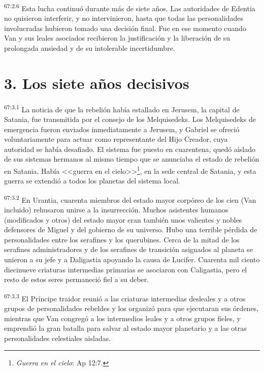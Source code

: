 \par
\textsuperscript{67:2.6} Esta lucha continuó durante más de siete años. Las autoridades de Edentia no quisieron interferir, y no intervinieron, hasta que todas las personalidades involucradas hubieron tomado una decisión final. Fue en ese momento cuando Van y sus leales asociados recibieron la justificación y la liberación de su prolongada ansiedad y de su intolerable incertidumbre.

\section*{3. Los siete años decisivos}
\par
\textsuperscript{67:3.1} La noticia de que la rebelión había estallado en Jerusem, la capital de Satania, fue transmitida por el consejo de los Melquisedeks. Los Melquisedeks de emergencia fueron enviados inmediatamente a Jerusem, y Gabriel se ofreció voluntariamente para actuar como representante del Hijo Creador, cuya autoridad se había desafiado. El sistema fue puesto en cuarentena, quedó aislado de sus sistemas hermanos al mismo tiempo que se anunciaba el estado de rebelión en Satania. Había <<guerra en el cielo>>\footnote{\textit{Guerra en el cielo}: Ap 12:7.}, en la sede central de Satania, y esta guerra se extendió a todos los planetas del sistema local.

\par
\textsuperscript{67:3.2} En Urantia, cuarenta miembros del estado mayor corpóreo de los cien (Van incluido) rehusaron unirse a la insurrección. Muchos asistentes humanos (modificados y otros) del estado mayor eran también unos valientes y nobles defensores de Miguel y del gobierno de su universo. Hubo una terrible pérdida de personalidades entre los serafines y los querubines. Cerca de la mitad de los serafines administradores y de los serafines de transición asignados al planeta se unieron a su jefe y a Daligastia apoyando la causa de Lucifer. Cuarenta mil ciento diecinueve criaturas intermedias primarias se asociaron con Caligastia, pero el resto de estos seres permaneció fiel a su deber.

\par
\textsuperscript{67:3.3} El Príncipe traidor reunió a las criaturas intermedias desleales y a otros grupos de personalidades rebeldes y los organizó para que ejecutaran sus órdenes, mientras que Van congregó a los intermedios leales y a otros grupos fieles, y emprendió la gran batalla para salvar al estado mayor planetario y a las otras personalidades celestiales aisladas.

